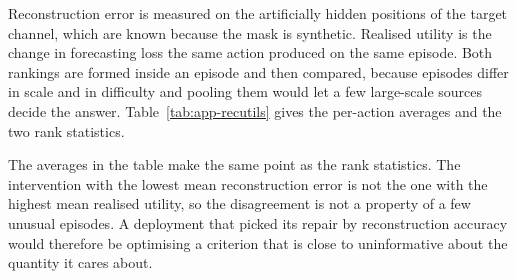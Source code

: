 \documentclass{article}
\begin{document}
Reconstruction error is measured on the artificially hidden positions of the target channel,
which are known because the mask is synthetic. Realised utility is the change in forecasting
loss the same action produced on the same episode. Both rankings are formed inside an episode
and then compared, because episodes differ in scale and in difficulty and pooling them would
let a few large-scale sources decide the answer. Table~\ref{tab:app-recutils} gives the
per-action averages and the two rank statistics.

\begin{table}[h]
  \caption{Reconstruction quality against realised forecasting utility, over the five catalog
  interventions on the held-out evaluation episodes. Reconstruction error is measured on the
  hidden positions and realised utility against \textsc{Keep} on the same backbone. Winner
  agreement is the share of episodes on which the most accurate reconstruction is also the most
  useful intervention, and the discordant rate is the share of ordered pairs whose two rankings
  disagree.}
  \label{tab:app-recutils}
  \centering
  \small
  \setlength{\tabcolsep}{4pt}
\end{table}

The averages in the table make the same point as the rank statistics. The intervention with the
lowest mean reconstruction error is not the one with the highest mean realised utility, so the
disagreement is not a property of a few unusual episodes. A deployment that picked its repair
by reconstruction accuracy would therefore be optimising a criterion that is close to
uninformative about the quantity it cares about.
\end{document}
